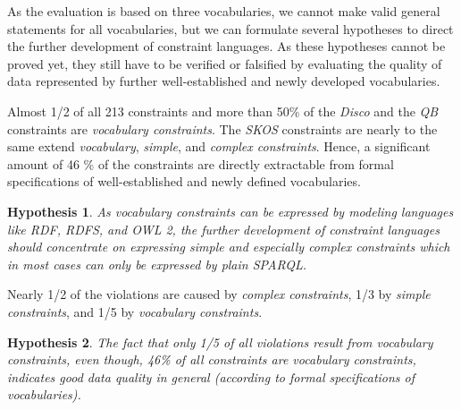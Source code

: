 \documentclass{llncs}
\newcommand{\tb}[1]{\todo[size=\small, color=green!40]{\textbf{Thomas:} #1}}
\newtheorem{hyp}{Hypothesis}
\begin{document}
{{As the evaluation is based on three vocabularies, 
we cannot make valid general statements for all vocabularies,
but we can formulate several hypotheses to direct the further development of constraint languages.
As these hypotheses cannot be proved yet, 
they still have to be verified or falsified
by evaluating the quality of data represented by further well-established and newly developed vocabularies.



Almost 1/2 of all 213 constraints and more than 50\% of the \emph{Disco} and the \emph{QB} constraints are \emph{vocabulary constraints}.
The \emph{SKOS} constraints are nearly to the same extend \emph{vocabulary}, \emph{simple}, and \emph{complex constraints}. 
Hence, a significant amount of 46 \% of the constraints are directly extractable from formal specifications of well-established and newly defined vocabularies. 
\begin{hyp}
As vocabulary constraints can be expressed by modeling languages like RDF, RDFS, and OWL 2,
the further development of constraint languages should concentrate on expressing simple and especially complex constraints which in most cases can only be expressed by plain SPARQL.   
\end{hyp} 

Nearly 1/2 of the violations are caused by \emph{complex constraints}, 1/3 by \emph{simple constraints}, and 1/5 by \emph{vocabulary constraints}.

\begin{hyp}
The fact that only 1/5 of all violations result from vocabulary constraints, 
even though, 46\% of all constraints are vocabulary constraints,
indicates good data quality in general (according to formal specifications of vocabularies).
\end{hyp}

}}
\end{document}
